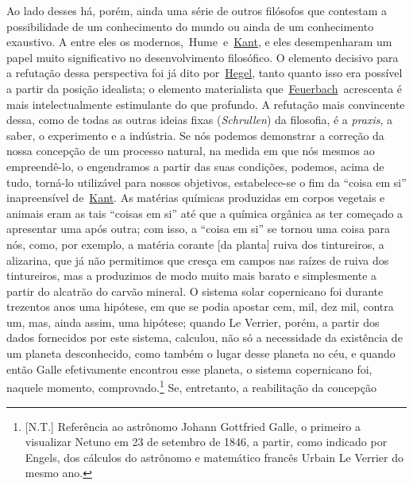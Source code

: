 Ao lado desses há, porém, ainda uma série de outros filósofos que
contestam a possibilidade de um conhecimento do mundo ou ainda de um
conhecimento exaustivo. A entre eles os
modernos,~Hume~e~\href{https://www.marxists.org/portugues/dicionario/verbetes/k/kant.htm}{Kant},
e eles desempenharam um papel muito significativo no desenvolvimento
filosófico. O elemento decisivo para a refutação dessa perspectiva foi
já dito
por~\href{https://www.marxists.org/portugues/dicionario/verbetes/h/hegel.htm}{Hegel},
tanto quanto isso era possível a partir da posição idealista; o elemento
materialista
que~\href{https://www.marxists.org/portugues/dicionario/verbetes/f/feuerbach.htm}{Feuerbach}~acrescenta
é mais intelectualmente estimulante do que profundo. A refutação mais
convincente dessa, como de todas as outras ideias fixas
(\emph{Schrullen}) da filosofia, é a \emph{praxis}, a saber, o
experimento e a indústria. Se nós podemos demonstrar a correção da nossa
concepção de um processo natural, na medida em que nós mesmos ao
empreendê-lo, o engendramos a partir das suas condições, podemos, acima
de tudo, torná-lo utilizável para nossos objetivos, estabelece-se o fim
da ``coisa em si'' inapreensível
de~\href{https://www.marxists.org/portugues/dicionario/verbetes/k/kant.htm}{Kant}.
As matérias químicas produzidas em corpos vegetais e animais eram as
tais ``coisas em si'' até que a química orgânica as ter começado a
apresentar uma após outra; com isso, a ``coisa em si'' se tornou uma
coisa para nós, como, por exemplo, a matéria corante {[}da planta{]}
ruiva dos tintureiros, a alizarina, que já não permitimos que cresça em
campos nas raízes de ruiva dos tintureiros, mas a produzimos de modo
muito mais barato e simplesmente a partir do alcatrão do carvão mineral.
O sistema solar copernicano foi durante trezentos anos uma hipótese, em
que se podia apostar cem, mil, dez mil, contra um, mas, ainda assim, uma
hipótese; quando Le Verrier, porém, a partir dos dados fornecidos por
este sistema, calculou, não só a necessidade da existência de um planeta
desconhecido, como também o lugar desse planeta no céu, e quando então
Galle efetivamente encontrou esse planeta,\protect\hypertarget{n196}{}{}
o sistema copernicano foi, naquele momento, comprovado.\footnote{{[}N.T.{]}
  Referência ao astrônomo Johann Gottfried Galle, o primeiro a
  visualizar Netuno em 23 de setembro de 1846, a partir, como indicado
  por Engels, dos cálculos do astrônomo e matemático francês Urbain Le
  Verrier do mesmo ano.} Se, entretanto, a reabilitação da concepção
